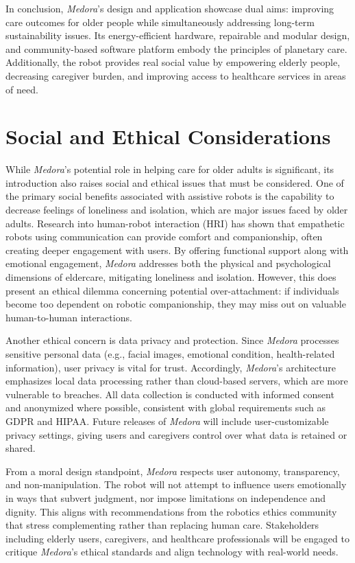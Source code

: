 In conclusion, \textit{Medora}'s design and application showcase dual aims: improving care outcomes for older people while simultaneously addressing long-term sustainability issues. Its energy-efficient hardware, repairable and modular design, and community-based software platform embody the principles of planetary care. Additionally, the robot provides real social value by empowering elderly people, decreasing caregiver burden, and improving access to healthcare services in areas of need.

\section{ Social and Ethical Considerations}

While \textit{Medora}'s potential role in helping care for older adults is significant, its introduction also raises social and ethical issues that must be considered. One of the primary social benefits associated with assistive robots is the capability to decrease feelings of loneliness and isolation, which are major issues faced by older adults. Research into human-robot interaction (HRI) has shown that empathetic robots using communication can provide comfort and companionship, often creating deeper engagement with users. By offering functional support along with emotional engagement, \textit{Medora} addresses both the physical and psychological dimensions of eldercare, mitigating loneliness and isolation. However, this does present an ethical dilemma concerning potential over-attachment: if individuals become too dependent on robotic companionship, they may miss out on valuable human-to-human interactions.

Another ethical concern is data privacy and protection. Since \textit{Medora} processes sensitive personal data (e.g., facial images, emotional condition, health-related information), user privacy is vital for trust. Accordingly, \textit{Medora}'s architecture emphasizes local data processing rather than cloud-based servers, which are more vulnerable to breaches. All data collection is conducted with informed consent and anonymized where possible, consistent with global requirements such as GDPR and HIPAA. Future releases of \textit{Medora} will include user-customizable privacy settings, giving users and caregivers control over what data is retained or shared.

From a moral design standpoint, \textit{Medora} respects user autonomy, transparency, and non-manipulation. The robot will not attempt to influence users emotionally in ways that subvert judgment, nor impose limitations on independence and dignity. This aligns with recommendations from the robotics ethics community that stress complementing rather than replacing human care. Stakeholders including elderly users, caregivers, and healthcare professionals will be engaged to critique \textit{Medora}'s ethical standards and align technology with real-world needs.

